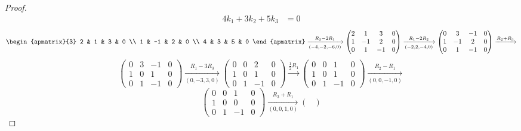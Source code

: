 \documentclass{article}
\begin{document}
\begin{enumerate}
\begin{proof}
\begin{align*}
            4k_1 + 3k_2 + 5k_3 & = 0
        \end{align*}
        \[
            \begin{apmatrix}{3}
                2 & 1 & 3 & 0 \\
                1 & -1 & 2 & 0 \\
                4 & 3 & 5 & 0
            \end{apmatrix} \xrightarrow[(-4,-2,-6,0)]{R_3 - 2R_1}
            \begin{pmatrix}
                2 & 1  & 3  & 0 \\
                1 & -1 & 2  & 0 \\
                0 & 1  & -1 & 0
            \end{pmatrix} \xrightarrow[(-2,2,-4,0)]{R_1 - 2R_2}
            \begin{pmatrix}
                0 & 3  & -1 & 0 \\
                1 & -1 & 2  & 0 \\
                0 & 1  & -1 & 0
            \end{pmatrix} \xrightarrow{R_2 + R_3}
        \]
        \[
            \begin{pmatrix}
                0 & 3 & -1 & 0 \\
                1 & 0 & 1  & 0 \\
                0 & 1 & -1 & 0
            \end{pmatrix} \xrightarrow[(0,-3,3,0)]{R_1 - 3R_3}
            \begin{pmatrix}
                0 & 0 & 2  & 0 \\
                1 & 0 & 1  & 0 \\
                0 & 1 & -1 & 0
            \end{pmatrix} \xrightarrow{\frac{1}{2}R_1}
            \begin{pmatrix}
                0 & 0 & 1  & 0 \\
                1 & 0 & 1  & 0 \\
                0 & 1 & -1 & 0
            \end{pmatrix} \xrightarrow[(0,0,-1,0)]{R_2 - R_1}
        \]
        \[
            \begin{pmatrix}
                0 & 0 & 1  & 0 \\
                1 & 0 & 0  & 0 \\
                0 & 1 & -1 & 0
            \end{pmatrix} \xrightarrow[(0,0,1,0)]{R_3 + R_1}
            \begin{pmatrix}

\end{pmatrix}\]
\end{proof}
\end{enumerate}
\end{document}
